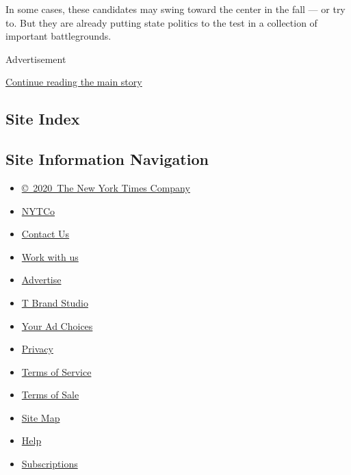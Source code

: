 In some cases, these candidates may swing toward the center in the fall
--- or try to. But they are already putting state politics to the test
in a collection of important battlegrounds.

Advertisement

\protect\hyperlink{after-bottom}{Continue reading the main story}

\hypertarget{site-index}{%
\subsection{Site Index}\label{site-index}}

\hypertarget{site-information-navigation}{%
\subsection{Site Information
Navigation}\label{site-information-navigation}}

\begin{itemize}
\tightlist
\item
  \href{https://help.nytimes3xbfgragh.onion/hc/en-us/articles/115014792127-Copyright-notice}{©~2020~The
  New York Times Company}
\end{itemize}

\begin{itemize}
\tightlist
\item
  \href{https://www.nytco.com/}{NYTCo}
\item
  \href{https://help.nytimes3xbfgragh.onion/hc/en-us/articles/115015385887-Contact-Us}{Contact
  Us}
\item
  \href{https://www.nytco.com/careers/}{Work with us}
\item
  \href{https://nytmediakit.com/}{Advertise}
\item
  \href{http://www.tbrandstudio.com/}{T Brand Studio}
\item
  \href{https://www.nytimes3xbfgragh.onion/privacy/cookie-policy\#how-do-i-manage-trackers}{Your
  Ad Choices}
\item
  \href{https://www.nytimes3xbfgragh.onion/privacy}{Privacy}
\item
  \href{https://help.nytimes3xbfgragh.onion/hc/en-us/articles/115014893428-Terms-of-service}{Terms
  of Service}
\item
  \href{https://help.nytimes3xbfgragh.onion/hc/en-us/articles/115014893968-Terms-of-sale}{Terms
  of Sale}
\item
  \href{https://spiderbites.nytimes3xbfgragh.onion}{Site Map}
\item
  \href{https://help.nytimes3xbfgragh.onion/hc/en-us}{Help}
\item
  \href{https://www.nytimes3xbfgragh.onion/subscription?campaignId=37WXW}{Subscriptions}
\end{itemize}
